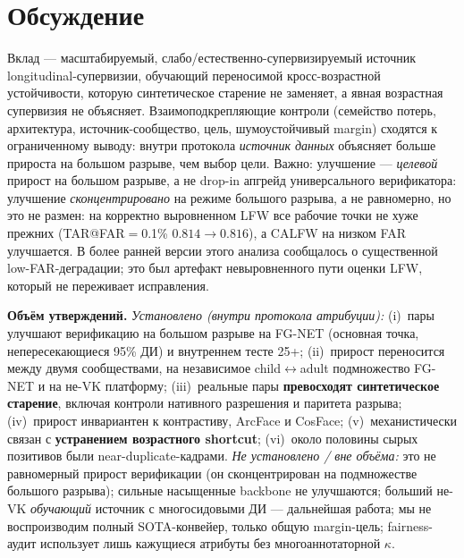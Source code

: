 \documentclass[10pt,twocolumn,letterpaper]{article}
\begin{document}
\section{Обсуждение}\label{sec:discussion}
Вклад — масштабируемый, слабо/естественно-супервизируемый источник longitudinal-супервизии, обучающий
переносимой кросс-возрастной устойчивости, которую синтетическое старение не заменяет, а явная
возрастная супервизия не объясняет. Взаимоподкрепляющие контроли (семейство потерь, архитектура,
источник-сообщество, цель, шумоустойчивый margin) сходятся к ограниченному выводу: внутри протокола
\emph{источник данных} объясняет больше прироста на большом разрыве, чем выбор цели. Важно: улучшение —
\emph{целевой} прирост на большом разрыве, а не drop-in апгрейд универсального верификатора: улучшение \emph{сконцентрировано} на режиме большого разрыва, а не равномерно, но это не размен: на корректно выровненном LFW все рабочие точки не хуже прежних (TAR@FAR$=$0.1\% $0.814\rightarrow0.816$), а CALFW на низком FAR улучшается. В более ранней версии этого анализа сообщалось о существенной low-FAR-деградации; это был артефакт невыровненного пути оценки LFW, который не переживает исправления.

\textbf{Объём утверждений.} \emph{Установлено (внутри протокола атрибуции):} (i)~пары улучшают верификацию
на большом разрыве на FG-NET (основная точка, непересекающиеся 95\% ДИ) и внутреннем тесте 25+;
(ii)~прирост переносится между двумя сообществами, на независимое child$\leftrightarrow$adult
подмножество FG-NET и на не-VK платформу; (iii)~реальные пары \textbf{превосходят синтетическое старение},
включая контроли нативного разрешения и паритета разрыва; (iv)~прирост инвариантен к контрастиву, ArcFace
и CosFace; (v)~механистически связан с \textbf{устранением возрастного shortcut}; (vi)~около половины
сырых позитивов были near-duplicate-кадрами. \emph{Не установлено / вне объёма:} это не равномерный прирост верификации (он сконцентрирован на подмножестве большого разрыва); сильные насыщенные backbone не улучшаются; больший
не-VK \emph{обучающий} источник с многосидовыми ДИ — дальнейшая работа; мы не воспроизводим полный
SOTA-конвейер, только общую margin-цель; fairness-аудит использует лишь кажущиеся атрибуты без
многоаннотаторной $\kappa$.
\end{document}
